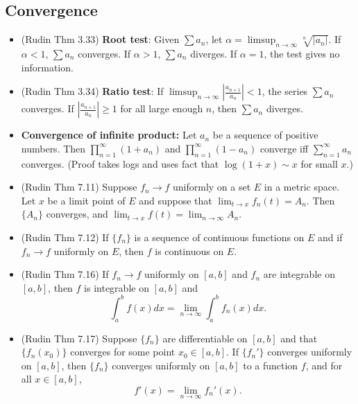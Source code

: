 \documentclass[twoside]{article}
\newcommand{\dis}{\displaystyle}
\newcommand\goesto{\rightarrow}
\begin{document}
\subsection{Convergence}
\begin{itemize}
\item (Rudin Thm 3.33) \textbf{Root test}: Given $\sum a_n$, let $\alpha = \displaystyle\limsup_{n \goesto \infty} \sqrt[n]{|a_n|}$. If $\alpha < 1$, $\sum a_n$ converges. If $\alpha > 1$, $\sum a_n$ diverges. If $\alpha = 1$, the test gives no information.

\item (Rudin Thm 3.34) \textbf{Ratio test}: If $\displaystyle\limsup_{n \goesto \infty}\left|\frac{a_{n+1}}{a_n}\right| < 1$, the series $\sum a_n$ converges. If $\displaystyle\left|\frac{a_{n+1}}{a_n}\right| \geq 1$ for all large enough $n$, then $\sum a_n$ diverges. 

\item \textbf{Convergence of infinite product:} Let $a_n$ be a sequence of positive numbers. Then $\dis\prod_{n=1}^\infty (1+a_n)$ and $\dis\prod_{n=1}^\infty (1-a_n)$ converge iff $\dis\sum_{n=1}^\infty a_n$ converges. (Proof takes logs and uses fact that $\log (1 + x) \sim x$ for small $x$.)

\item (Rudin Thm 7.11) Suppose $f_n \goesto f$ uniformly on a set $E$ in a metric space. Let $x$ be a limit point of $E$ and suppose that $\displaystyle\lim_{t \goesto x} f_n(t) = A_n$. Then $\{ A_n\}$ converges, and $\displaystyle\lim_{t \goesto x} f(t) = \displaystyle\lim_{n \goesto \infty} A_n$.

\item (Rudin Thm 7.12) If $\{ f_n\}$ is a sequence of continuous functions on $E$ and if $f_n \goesto f$ uniformly on $E$, then $f$ is continuous on $E$.

\item (Rudin Thm 7.16) If $f_n \goesto f$ uniformly on $[a,b]$ and $f_n$ are integrable on $[a,b]$, then $f$ is integrable on $[a,b]$ and
\begin{equation*}
\int_a^b f(x) dx = \lim_{n \goesto \infty} \int_a^b f_n (x) dx.
\end{equation*}

\item (Rudin Thm 7.17) Suppose $\{f_n\}$ are differentiable on $[a,b]$ and that $\{ f_n(x_0)\}$ converges for some point $x_0 \in [a,b]$. If $\{f_n' \}$ converges uniformly on $[a,b]$, then $\{ f_n\}$ converges uniformly on $[a,b]$ to a function $f$, and for all $x \in [a,b]$,
\begin{equation*}
f'(x) = \lim_{n \goesto \infty} f_n'(x).
\end{equation*}


\end{itemize}
\end{document}
